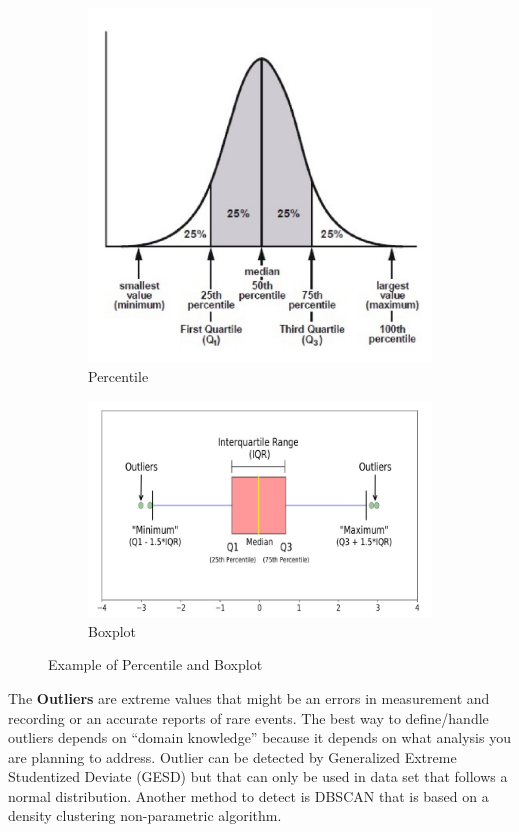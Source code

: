 \begin{figure}[H]
    \begin{subfigure}{.5\textwidth}
        \centering
        \includegraphics[width=.6\linewidth]{images/DataExplVis/Percentile.png}
        \caption{Percentile}
        \label{fig:sub1}
    \end{subfigure}
    \begin{subfigure}{.5 \textwidth}
        \centering
        \includegraphics[width=.8\linewidth]{images/DataExplVis/Boxplot.png}
        \caption{Boxplot}
        \label{fig:sub1}
    \end{subfigure}
    \caption{Example of Percentile and Boxplot}
\end{figure}

The \textbf{Outliers} are extreme values that might be an errors in measurement and recording or an accurate reports of rare events. The best way to define/handle outliers depends on “domain knowledge” because it depends on what analysis you are planning to address.
Outlier can be detected by Generalized Extreme Studentized Deviate (GESD) but that can only be used in data set that follows a normal distribution. Another method to detect is DBSCAN that is based on a density clustering non-parametric algorithm.

